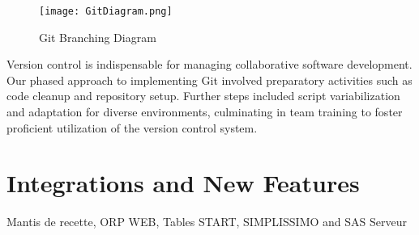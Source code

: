 \begin{figure}
    \centering
    \texttt{[image: GitDiagram.png]}
    \caption{Git Branching Diagram}
    \label{fig:git-diagram}
\end{figure}

Version control is indispensable for managing collaborative software development. Our phased approach to implementing Git involved preparatory activities such as code cleanup and repository setup. Further steps included script variabilization and adaptation for diverse environments, culminating in team training to foster proficient utilization of the version control system.

\section{Integrations and New Features}
Mantis de recette, ORP WEB, Tables START, SIMPLISSIMO and SAS Serveur